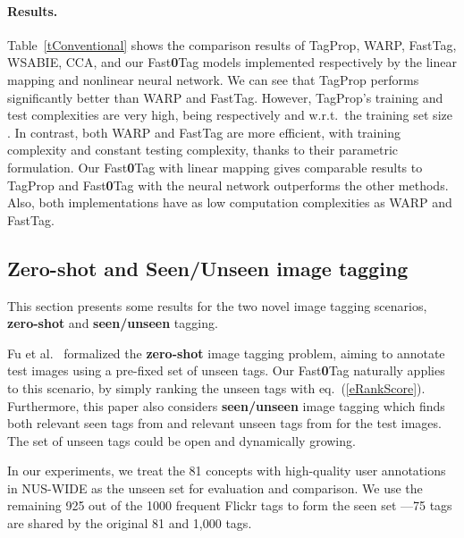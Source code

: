 \documentclass[10pt,twocolumn,letterpaper]{article}
\newcommand{\eat}[1]{{}}
\newcommand{\ours}{{Fast\textbf{0}Tag}}
\begin{document}
\paragraph{Results.} Table~\ref{tConventional} shows the comparison results of TagProp, WARP, FastTag, WSABIE, CCA, and our {\ours} models implemented respectively by the linear mapping and nonlinear neural network. We can see that TagProp performs significantly better than WARP and FastTag. However, TagProp's training and test complexities are very high, being respectively  and  w.r.t.\ the training set size . In contrast, both WARP and FastTag are more efficient, with  training complexity and constant testing complexity, thanks to their parametric formulation. Our {\ours} with linear mapping gives comparable results to TagProp and {\ours} with the neural network outperforms the other methods. Also,  both implementations  have as low computation complexities as WARP and FastTag.  

 









\subsection{Zero-shot and Seen/Unseen image tagging}
This section presents some results for the two novel image tagging scenarios, \textbf{zero-shot} and \textbf{seen/unseen} tagging. 

\eat{In conventional image tagging, one  assigns tags to images by selecting from a closed and fixed vocabulary of tags. This is rather stringent; in real-world applications new tags show up and become popular over time. \eat{There are about 53M unique tags on Flickr. }How to handle tags previously unseen at training is thus imperative. }

Fu et al.~\cite{fu_transductive_2015} formalized the \textbf{zero-shot} image tagging problem, aiming to annotate test images using a pre-fixed set  of unseen tags. Our {\ours} naturally applies to this scenario, by simply ranking the unseen tags with eq.~(\ref{eRankScore}). Furthermore, this paper also considers \textbf{seen/unseen} image tagging which finds both relevant seen tags from  and relevant unseen tags from  for the test images. The set of unseen tags  could be open and dynamically growing. 

In our experiments, we treat the 81 concepts with high-quality user annotations in NUS-WIDE as the unseen set  for evaluation and comparison. We use the remaining 925 out of  the 1000 frequent Flickr tags to form the seen set ---75 tags are shared by the original 81 and 1,000 tags. 
\vspace{-10pt}
\end{document}
